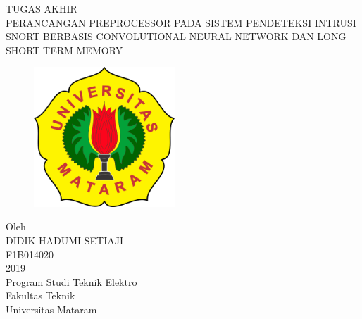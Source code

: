 \documentclass[a4paper, 11pt, oneside]{book}
\begin{document}
 
\begin{titlepage}
	\centering 
	\scshape 
	\vspace*{\baselineskip} 
	\vspace{0.75\baselineskip} 
	{TUGAS AKHIR\\
	\vspace{0.\baselineskip}
	PERANCANGAN PREPROCESSOR PADA SISTEM PENDETEKSI INTRUSI SNORT BERBASIS CONVOLUTIONAL NEURAL NETWORK DAN LONG SHORT TERM MEMORY\\}
	\vspace{0.75\baselineskip}
	\vspace{2\baselineskip} 
	\begin{figure}[h!]
	\begin{center}
	    \includegraphics[width=150pt]{skripsi/logo}
	\end{center}
	\end{figure}
	\vspace*{3\baselineskip} 
	Oleh \\
	\vspace{0.5\baselineskip} 
	{\scshape\Large DIDIK HADUMI SETIAJI \\ F1B014020 \\} 
	\vspace{0.5\baselineskip} 
	\vfill
	\vspace{0.3\baselineskip} 
	2019 \\
	{\large Program Studi Teknik Elektro \\ Fakultas Teknik \\ Universitas Mataram} 
\end{titlepage}
\end{document}
